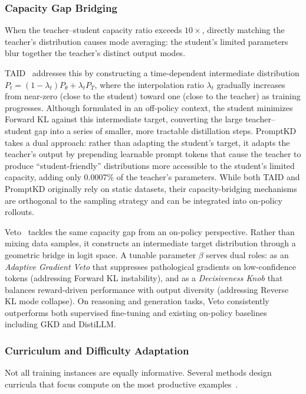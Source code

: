 \documentclass{article} %
\begin{document}
\subsubsection{Capacity Gap Bridging}

When the teacher--student capacity ratio exceeds $10\times$, directly matching the teacher's distribution causes mode averaging: the student's limited parameters blur together the teacher's distinct output modes.

TAID~\citep{2501.16937} addresses this by constructing a time-dependent intermediate distribution $P_t = (1{-}\lambda_t)P_\theta + \lambda_t P_T$, where the interpolation ratio $\lambda_t$ gradually increases from near-zero (close to the student) toward one (close to the teacher) as training progresses. Although formulated in an off-policy context, the student minimizes Forward KL against this intermediate target, converting the large teacher--student gap into a series of smaller, more tractable distillation steps. PromptKD~\citep{2402.12842} takes a dual approach: rather than adapting the student's target, it adapts the teacher's output by prepending learnable prompt tokens that cause the teacher to produce ``student-friendly'' distributions more accessible to the student's limited capacity, adding only 0.0007\% of the teacher's parameters. While both TAID and PromptKD originally rely on static datasets, their capacity-bridging mechanisms are orthogonal to the sampling strategy and can be integrated into on-policy rollouts.

Veto~\citep{2601.07155} tackles the same capacity gap from an on-policy perspective. Rather than mixing data samples, it constructs an intermediate target distribution through a geometric bridge in logit space. A tunable parameter $\beta$ serves dual roles: as an \emph{Adaptive Gradient Veto} that suppresses pathological gradients on low-confidence tokens (addressing Forward KL instability), and as a \emph{Decisiveness Knob} that balances reward-driven performance with output diversity (addressing Reverse KL mode collapse). On reasoning and generation tasks, Veto consistently outperforms both supervised fine-tuning and existing on-policy baselines including GKD and DistiLLM.

\subsubsection{Curriculum and Difficulty Adaptation}

Not all training instances are equally informative. Several methods design curricula that focus compute on the most productive examples~\citep{2603.11178,2510.07842,2305.12870}.
\end{document}
